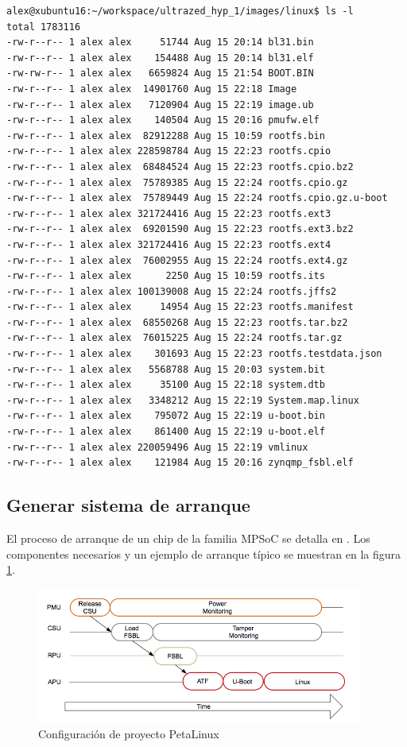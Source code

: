\begin{lstlisting}[style=CStyle]
alex@xubuntu16:~/workspace/ultrazed_hyp_1/images/linux$ ls -l
total 1783116
-rw-r--r-- 1 alex alex     51744 Aug 15 20:14 bl31.bin
-rw-r--r-- 1 alex alex    154488 Aug 15 20:14 bl31.elf
-rw-rw-r-- 1 alex alex   6659824 Aug 15 21:54 BOOT.BIN
-rw-r--r-- 1 alex alex  14901760 Aug 15 22:18 Image
-rw-r--r-- 1 alex alex   7120904 Aug 15 22:19 image.ub
-rw-r--r-- 1 alex alex    140504 Aug 15 20:16 pmufw.elf
-rw-r--r-- 1 alex alex  82912288 Aug 15 10:59 rootfs.bin
-rw-r--r-- 1 alex alex 228598784 Aug 15 22:23 rootfs.cpio
-rw-r--r-- 1 alex alex  68484524 Aug 15 22:23 rootfs.cpio.bz2
-rw-r--r-- 1 alex alex  75789385 Aug 15 22:24 rootfs.cpio.gz
-rw-r--r-- 1 alex alex  75789449 Aug 15 22:24 rootfs.cpio.gz.u-boot
-rw-r--r-- 1 alex alex 321724416 Aug 15 22:23 rootfs.ext3
-rw-r--r-- 1 alex alex  69201590 Aug 15 22:23 rootfs.ext3.bz2
-rw-r--r-- 1 alex alex 321724416 Aug 15 22:23 rootfs.ext4
-rw-r--r-- 1 alex alex  76002955 Aug 15 22:24 rootfs.ext4.gz
-rw-r--r-- 1 alex alex      2250 Aug 15 10:59 rootfs.its
-rw-r--r-- 1 alex alex 100139008 Aug 15 22:24 rootfs.jffs2
-rw-r--r-- 1 alex alex     14954 Aug 15 22:23 rootfs.manifest
-rw-r--r-- 1 alex alex  68550268 Aug 15 22:23 rootfs.tar.bz2
-rw-r--r-- 1 alex alex  76015225 Aug 15 22:24 rootfs.tar.gz
-rw-r--r-- 1 alex alex    301693 Aug 15 22:23 rootfs.testdata.json
-rw-r--r-- 1 alex alex   5568788 Aug 15 20:03 system.bit
-rw-r--r-- 1 alex alex     35100 Aug 15 22:18 system.dtb
-rw-r--r-- 1 alex alex   3348212 Aug 15 22:19 System.map.linux
-rw-r--r-- 1 alex alex    795072 Aug 15 22:19 u-boot.bin
-rw-r--r-- 1 alex alex    861400 Aug 15 22:19 u-boot.elf
-rw-r--r-- 1 alex alex 220059496 Aug 15 22:19 vmlinux
-rw-r--r-- 1 alex alex    121984 Aug 15 20:16 zynqmp_fsbl.elf
\end{lstlisting}


\subsection{Generar sistema de arranque}

El proceso de arranque de un chip de la familia MPSoC se detalla en \cite{axi_trm}. Los componentes necesarios y un ejemplo de arranque típico se muestran en la figura \ref{fig:mpsoc_boot}.

\begin{figure}[!h]
	\centering
	\includegraphics[width=0.95\textwidth]{recursos/mpsoc_boot.png}
	\caption{Configuración de proyecto PetaLinux}
	\label{fig:mpsoc_boot}
\end{figure}


